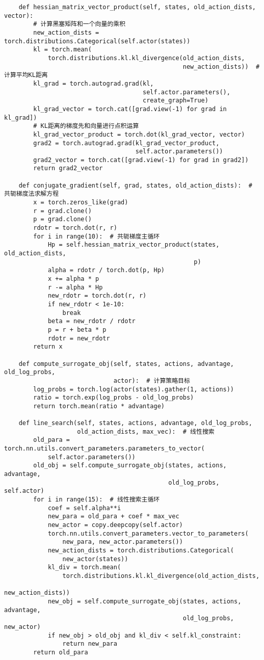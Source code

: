 \begin{lstlisting}
    def hessian_matrix_vector_product(self, states, old_action_dists, vector):
        # 计算黑塞矩阵和一个向量的乘积
        new_action_dists = torch.distributions.Categorical(self.actor(states))
        kl = torch.mean(
            torch.distributions.kl.kl_divergence(old_action_dists,
                                                 new_action_dists))  # 计算平均KL距离
        kl_grad = torch.autograd.grad(kl,
                                      self.actor.parameters(),
                                      create_graph=True)
        kl_grad_vector = torch.cat([grad.view(-1) for grad in kl_grad])
        # KL距离的梯度先和向量进行点积运算
        kl_grad_vector_product = torch.dot(kl_grad_vector, vector)
        grad2 = torch.autograd.grad(kl_grad_vector_product,
                                    self.actor.parameters())
        grad2_vector = torch.cat([grad.view(-1) for grad in grad2])
        return grad2_vector

    def conjugate_gradient(self, grad, states, old_action_dists):  # 共轭梯度法求解方程
        x = torch.zeros_like(grad)
        r = grad.clone()
        p = grad.clone()
        rdotr = torch.dot(r, r)
        for i in range(10):  # 共轭梯度主循环
            Hp = self.hessian_matrix_vector_product(states, old_action_dists,
                                                    p)
            alpha = rdotr / torch.dot(p, Hp)
            x += alpha * p
            r -= alpha * Hp
            new_rdotr = torch.dot(r, r)
            if new_rdotr < 1e-10:
                break
            beta = new_rdotr / rdotr
            p = r + beta * p
            rdotr = new_rdotr
        return x

    def compute_surrogate_obj(self, states, actions, advantage, old_log_probs,
                              actor):  # 计算策略目标
        log_probs = torch.log(actor(states).gather(1, actions))
        ratio = torch.exp(log_probs - old_log_probs)
        return torch.mean(ratio * advantage)

    def line_search(self, states, actions, advantage, old_log_probs,
                    old_action_dists, max_vec):  # 线性搜索
        old_para = torch.nn.utils.convert_parameters.parameters_to_vector(
            self.actor.parameters())
        old_obj = self.compute_surrogate_obj(states, actions, advantage,
                                             old_log_probs, self.actor)
        for i in range(15):  # 线性搜索主循环
            coef = self.alpha**i
            new_para = old_para + coef * max_vec
            new_actor = copy.deepcopy(self.actor)
            torch.nn.utils.convert_parameters.vector_to_parameters(
                new_para, new_actor.parameters())
            new_action_dists = torch.distributions.Categorical(
                new_actor(states))
            kl_div = torch.mean(
                torch.distributions.kl.kl_divergence(old_action_dists,
                                                     new_action_dists))
            new_obj = self.compute_surrogate_obj(states, actions, advantage,
                                                 old_log_probs, new_actor)
            if new_obj > old_obj and kl_div < self.kl_constraint:
                return new_para
        return old_para


\end{lstlisting}
